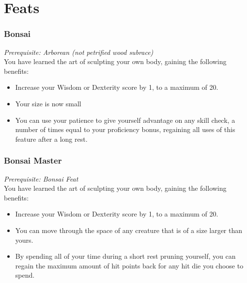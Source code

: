 \chapter{Feats}
\subsection{Bonsai}
\textit{Prerequisite: Arborean (not petrified wood subrace)}\\
\noindent You have learned the art of sculpting your own body, gaining the following benefits:
\begin{itemize}
    \item Increase your Wisdom or Dexterity score by 1, to a maximum of 20.
    \item Your size is now small
    \item You can use your patience to give yourself advantage on any skill check, a number of times equal to your proficiency bonus, regaining all uses of this feature after a long rest.
\end{itemize}
\subsection{Bonsai Master}
\textit{Prerequisite: Bonsai Feat}\\
\noindent You have learned the art of sculpting your own body, gaining the following benefits:
\begin{itemize}
    \item Increase your Wisdom or Dexterity score by 1, to a maximum of 20.
    \item You can move through the space of any creature that is of a size larger than yours.
    \item By spending all of your time during a short rest pruning yourself, you can regain the maximum amount of hit points back for any hit die you choose to spend.
\end{itemize}
